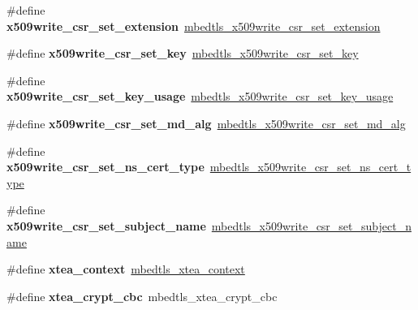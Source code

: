 \begin{DoxyCompactItemize}
\#define {\bfseries x509write\+\_\+csr\+\_\+set\+\_\+extension}~\mbox{\hyperlink{x509__csr_8h_a04e3c44ffeca58318250b7b1e6c416d1}{mbedtls\+\_\+x509write\+\_\+csr\+\_\+set\+\_\+extension}}
\item 
\mbox{\label{compat-1_83_8h_a1c8d3c7ea098b215d067d5e394620bd1}} 
\#define {\bfseries x509write\+\_\+csr\+\_\+set\+\_\+key}~\mbox{\hyperlink{x509__csr_8h_ac4f0b724b1c7006d178e2d71c964f54c}{mbedtls\+\_\+x509write\+\_\+csr\+\_\+set\+\_\+key}}
\item 
\mbox{\label{compat-1_83_8h_a779ef77637b61d3146424dd1d6072a4a}} 
\#define {\bfseries x509write\+\_\+csr\+\_\+set\+\_\+key\+\_\+usage}~\mbox{\hyperlink{x509__csr_8h_ac5ed085a0dee293f6c152ecd597473be}{mbedtls\+\_\+x509write\+\_\+csr\+\_\+set\+\_\+key\+\_\+usage}}
\item 
\mbox{\label{compat-1_83_8h_a5a300bba5cc1919bee05f707fd586637}} 
\#define {\bfseries x509write\+\_\+csr\+\_\+set\+\_\+md\+\_\+alg}~\mbox{\hyperlink{x509__csr_8h_a2be90e1d59d29b2309670700a8c0420f}{mbedtls\+\_\+x509write\+\_\+csr\+\_\+set\+\_\+md\+\_\+alg}}
\item 
\mbox{\label{compat-1_83_8h_a0bba58ef05e6470993378f6117f6248b}} 
\#define {\bfseries x509write\+\_\+csr\+\_\+set\+\_\+ns\+\_\+cert\+\_\+type}~\mbox{\hyperlink{x509__csr_8h_a22571c0a8439dcacaa9762eca4d73a6e}{mbedtls\+\_\+x509write\+\_\+csr\+\_\+set\+\_\+ns\+\_\+cert\+\_\+type}}
\item 
\mbox{\label{compat-1_83_8h_a4b5083b90eb884f03fbed7e74170125b}} 
\#define {\bfseries x509write\+\_\+csr\+\_\+set\+\_\+subject\+\_\+name}~\mbox{\hyperlink{x509__csr_8h_a954eae166b125cea2115b7db8c896e90}{mbedtls\+\_\+x509write\+\_\+csr\+\_\+set\+\_\+subject\+\_\+name}}
\item 
\mbox{\label{compat-1_83_8h_a710e106c84b0a26c46745aabf14d0987}} 
\#define {\bfseries xtea\+\_\+context}~\mbox{\hyperlink{structmbedtls__xtea__context}{mbedtls\+\_\+xtea\+\_\+context}}
\item 
\mbox{\label{compat-1_83_8h_a3fa01f3da535e980217f7d61975bf6ea}} 
\#define {\bfseries xtea\+\_\+crypt\+\_\+cbc}~mbedtls\+\_\+xtea\+\_\+crypt\+\_\+cbc
\item 

\end{DoxyCompactItemize}
